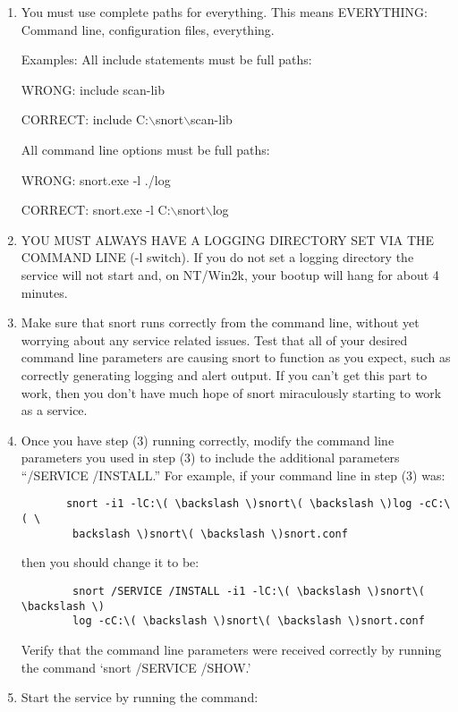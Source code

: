 \documentclass{article}
\begin{document}
\begin{enumerate}
\item You must use complete paths for everything. This means EVERYTHING: Command
    line, configuration files, everything. 
    
    Examples: All include statements must be full paths:

        WRONG: include scan-lib

        CORRECT: include C:\( \backslash \)snort\( \backslash \)scan-lib

    All command line options must be full paths:

        WRONG: snort.exe -l ./log

        CORRECT: snort.exe -l C:\( \backslash \)snort\( \backslash \)log

\item  YOU MUST ALWAYS HAVE A LOGGING DIRECTORY SET VIA THE COMMAND LINE (-l
    switch). If you do not set a logging directory the service will not start
    and, on NT/Win2k, your bootup will hang for about 4 minutes.
\item  Make sure that snort runs correctly from the command line, without yet
    worrying about any service related issues. Test that all of your desired
    command line parameters are causing snort to function as you expect, such
    as correctly generating logging and alert output. If you can't get this
    part to work, then you don't have much hope of snort miraculously starting
    to work as a service.
\item  Once you have step (3) running correctly, modify the command line
    parameters you used in step (3) to include the additional parameters 
    ``/SERVICE /INSTALL.'' For example, if your command line in step (3) was:
    	\begin{verbatim}
       snort -i1 -lC:\( \backslash \)snort\( \backslash \)log -cC:\( \
        backslash \)snort\( \backslash \)snort.conf
	\end{verbatim}
    then you should change it to be:
    	\begin{verbatim}
        snort /SERVICE /INSTALL -i1 -lC:\( \backslash \)snort\( \backslash \)
        log -cC:\( \backslash \)snort\( \backslash \)snort.conf
	\end{verbatim}
    Verify that the command line parameters were received correctly by running
    the command `snort /SERVICE /SHOW.'
\item  Start the service by running the command:
	\begin{verbatim}

\end{verbatim}
\end{enumerate}
\end{document}
